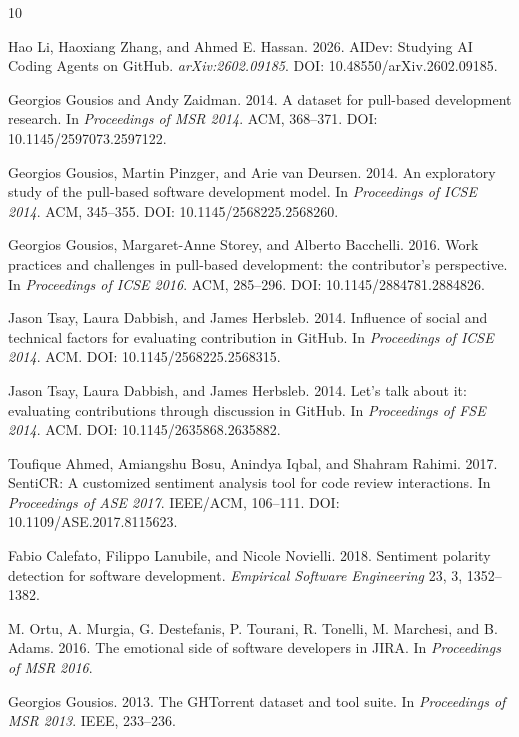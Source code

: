 \documentclass[sigconf,nonacm]{acmart}
\begin{document}

\begin{thebibliography}{10}

Hao Li, Haoxiang Zhang, and Ahmed E. Hassan. 2026.
\newblock AIDev: Studying AI Coding Agents on GitHub.
\newblock \emph{arXiv:2602.09185}. DOI: 10.48550/arXiv.2602.09185.

Georgios Gousios and Andy Zaidman. 2014.
\newblock A dataset for pull-based development research.
\newblock In \emph{Proceedings of MSR 2014}. ACM, 368--371. DOI: 10.1145/2597073.2597122.

Georgios Gousios, Martin Pinzger, and Arie van Deursen. 2014.
\newblock An exploratory study of the pull-based software development model.
\newblock In \emph{Proceedings of ICSE 2014}. ACM, 345--355. DOI: 10.1145/2568225.2568260.

Georgios Gousios, Margaret-Anne Storey, and Alberto Bacchelli. 2016.
\newblock Work practices and challenges in pull-based development: the contributor's perspective.
\newblock In \emph{Proceedings of ICSE 2016}. ACM, 285--296. DOI: 10.1145/2884781.2884826.

Jason Tsay, Laura Dabbish, and James Herbsleb. 2014.
\newblock Influence of social and technical factors for evaluating contribution in GitHub.
\newblock In \emph{Proceedings of ICSE 2014}. ACM. DOI: 10.1145/2568225.2568315.

Jason Tsay, Laura Dabbish, and James Herbsleb. 2014.
\newblock Let's talk about it: evaluating contributions through discussion in GitHub.
\newblock In \emph{Proceedings of FSE 2014}. ACM. DOI: 10.1145/2635868.2635882.

Toufique Ahmed, Amiangshu Bosu, Anindya Iqbal, and Shahram Rahimi. 2017.
\newblock SentiCR: A customized sentiment analysis tool for code review interactions.
\newblock In \emph{Proceedings of ASE 2017}. IEEE/ACM, 106--111. DOI: 10.1109/ASE.2017.8115623.

Fabio Calefato, Filippo Lanubile, and Nicole Novielli. 2018.
\newblock Sentiment polarity detection for software development.
\newblock \emph{Empirical Software Engineering} 23, 3, 1352--1382.

M. Ortu, A. Murgia, G. Destefanis, P. Tourani, R. Tonelli, M. Marchesi, and B. Adams. 2016.
\newblock The emotional side of software developers in JIRA.
\newblock In \emph{Proceedings of MSR 2016}.

Georgios Gousios. 2013.
\newblock The GHTorrent dataset and tool suite.
\newblock In \emph{Proceedings of MSR 2013}. IEEE, 233--236.

\end{thebibliography}
\end{document}
